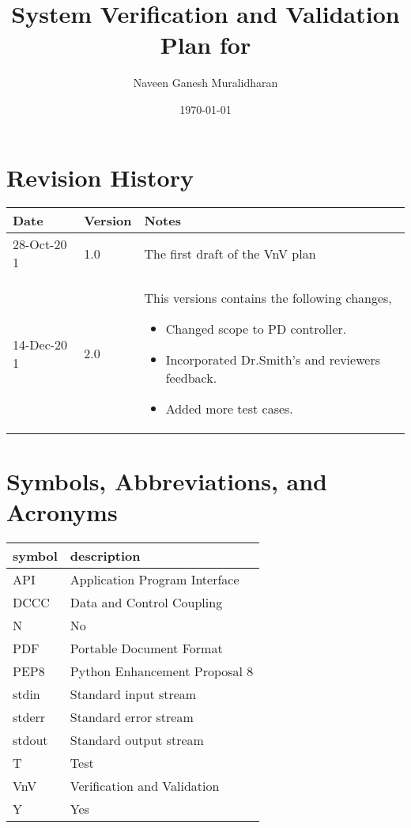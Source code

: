 \documentclass[12pt, titlepage]{article}
\begin{document}
\title{System Verification and Validation Plan for \progname{}} 
\author{Naveen Ganesh Muralidharan}
\date{\today}
	
\maketitle


\section{Revision History}

\begin{tabularx}{\textwidth}{p{3cm}p{2cm}X}
\toprule {\bf Date} & {\bf Version} & {\bf Notes}\\
\midrule
28-Oct-20 1 & 1.0 & The first draft of the VnV plan\\
14-Dec-20 1 & 2.0 & This versions contains the following changes,
\begin{itemize}
\item Changed scope to PD controller.
\item Incorporated Dr.Smith's and reviewers feedback.
\item Added more test cases.
\end{itemize}
\\
\bottomrule
\end{tabularx}

\newpage

\tableofcontents

\listoftables

\newpage

\section{Symbols, Abbreviations, and Acronyms}

\renewcommand{\arraystretch}{1.2}
\begin{tabular}{l l} 
  \toprule		
  \textbf{symbol} & \textbf{description}\\
  \midrule 
  API & Application Program Interface\\
  DCCC & Data and Control Coupling\\
  N & No\\
  PDF & Portable Document Format \\
  PEP8 & Python Enhancement Proposal 8\\
  stdin & Standard input stream\\
  stderr & Standard error stream\\
  stdout & Standard output stream\\
  T & Test\\
  VnV & Verification and Validation\\
  Y & Yes\\
  \bottomrule
\end{tabular}\\
\end{document}
